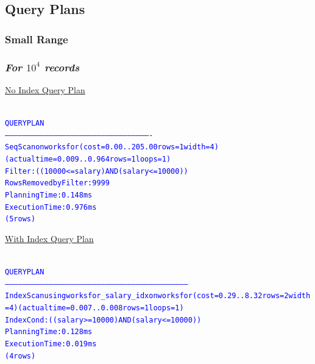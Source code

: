 \documentclass{article}
\begin{document}
    \subsection*{Query Plans}
    \subsubsection*{Small Range}
    \subsubsection*{\emph{For $10^4$ records}}
    \underline{No Index Query Plan}
    \begin{center}
      {\tiny
      \begin{alltt}
      \textcolor{blue}{
        QUERY PLAN                                             
        ----------------------------------------------------------------------------------------------------
         Seq Scan on worksfor  (cost=0.00..205.00 rows=1 width=4) (actual time=0.009..0.964 rows=1 loops=1)
           Filter: ((10000 <= salary) AND (salary <= 10000))
           Rows Removed by Filter: 9999
         Planning Time: 0.148 ms
         Execution Time: 0.976 ms
        (5 rows)
       }
      \end{alltt}
      }
    \end{center}
    \underline{With Index Query Plan}
    \begin{center}
      {\tiny
      \begin{alltt}
      \textcolor{blue}{
        QUERY PLAN                                                          
        ------------------------------------------------------------------------------------------------------------------------------
         Index Scan using worksfor_salary_idx on worksfor  (cost=0.29..8.32 rows=2 width=4) (actual time=0.007..0.008 rows=1 loops=1)
           Index Cond: ((salary >= 10000) AND (salary <= 10000))
         Planning Time: 0.128 ms
         Execution Time: 0.019 ms
        (4 rows)
       }
      \end{alltt}
      }
    \end{center}
\end{document}
